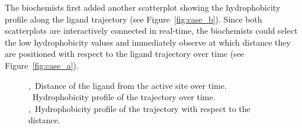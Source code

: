 \documentclass[twocolumn]{bmcart}%
\begin{document}
The biochemists first added another scatterplot showing the hydrophobicity profile along the ligand trajectory (see Figure~\ref{fig:case_b}).
Since both scatterplots are interactively connected in real-time, the biochemists could select the low hydrophobicity values and immediately observe at which distance they are positioned with respect to the ligand trajectory over time  (see Figure~\ref{fig:case_a}). 

\begin{figure}[htb]
	\centering
  \caption{
  ,~Distance of the ligand from the active site over time. 
  ~Hydrophobicity profile of the trajectory over time.
  ,~Hydrophobicity profile of the trajectory with respect to the distance.
  }
\end{figure} 
\end{document}
